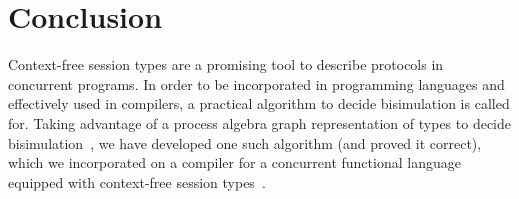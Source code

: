 \section{Conclusion}
\label{sec:conclusion}

Context-free session types are a promising tool to describe protocols
in concurrent programs. In order to be incorporated in programming
languages and effectively used in compilers, a practical algorithm to
decide bisimulation is called for.
%
Taking advantage of a process algebra graph representation of types to
decide
bisimulation~\cite{DBLP:journals/tcs/HirshfeldJM96,DBLP:conf/concur/HirshfeldM94},
we have developed one such algorithm (and proved it correct), which we
incorporated on a compiler for a concurrent functional language
equipped with context-free session types~\cite{freeST}.


